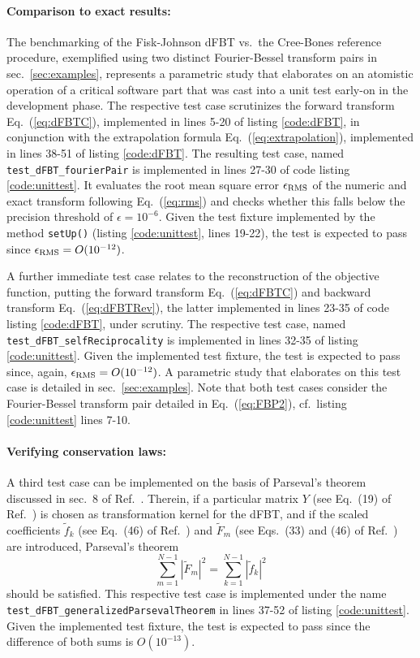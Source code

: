 \documentclass[12pt]{iopart}
\begin{document}
\paragraph{Comparison to exact results:}
The benchmarking of the Fisk-Johnson dFBT vs.\ the Cree-Bones reference
procedure, exemplified using two distinct Fourier-Bessel transform pairs in
sec.\ \ref{sec:examples}, represents a parametric study that elaborates on an
atomistic operation of a critical software part that was cast into a unit test
early-on in the development phase. 
The respective test case scrutinizes the forward transform Eq.\ (\ref{eq:dFBTC}),
implemented in lines 5-20 of listing \ref{code:dFBT}, in conjunction with the
extrapolation formula Eq.\ (\ref{eq:extrapolation}), implemented in lines 38-51
of listing \ref{code:dFBT}.  The resulting test case, named
{\tt{test\_dFBT\_fourierPair}} is implemented in lines 27-30 of code listing
\ref{code:unittest}. 
It evaluates the root mean square error $\epsilon_{\rm{RMS}}$ of the numeric
and exact transform following Eq.\ (\ref{eq:rms}) and checks whether this falls
below the precision threshold of $\epsilon=10^{-6}$. Given the test fixture
implemented by the method {\tt{setUp()}} (listing \ref{code:unittest}, lines
19-22), the test is expected to pass since $\epsilon_{\rm{RMS}}=O(10^{-12})$.

A further immediate test case relates to the reconstruction of the objective
function, putting the forward transform Eq.\ (\ref{eq:dFBTC}) and backward
transform Eq.\ (\ref{eq:dFBTRev}), the latter implemented in lines 23-35 of code
listing \ref{code:dFBT}, under scrutiny. The respective test case, named
{\tt{test\_dFBT\_selfReciprocality}} is implemented in lines 32-35 of listing
\ref{code:unittest}. Given the implemented test fixture, the test is expected
to pass since, again, $\epsilon_{\rm{RMS}}=O(10^{-12})$. A parametric study
that elaborates on this test case is detailed in sec.\ \ref{sec:examples}.
Note that both test cases consider the Fourier-Bessel transform pair detailed
in Eq.\ (\ref{eq:FBP2}), cf.\ listing \ref{code:unittest} lines 7-10.

\paragraph{Verifying conservation laws:}
A third test case can be implemented on the basis of Parseval's theorem
discussed in sec.\ 8 of Ref.\ \cite{Baddour:2015}. Therein, if a particular
matrix $Y$ (see Eq.\ (19) of Ref.\ \cite{Baddour:2015}) is chosen as
transformation kernel for the dFBT, and if the scaled coefficients
$\tilde{f}_{k}$ (see Eq.\ (46) of Ref.\
\cite{Baddour:2015}) and $\tilde{F}_{m}$ (see Eqs.\ (33) and (46) of
Ref.\ \cite{Baddour:2015}) are introduced, Parseval's theorem 
\begin{equation}
\sum_{m=1}^{N-1} | \tilde{F}_{m}|^2 = \sum_{k=1}^{N-1} | \tilde{f}_{k}|^2 
\end{equation}
should be satisfied.
This respective test case is implemented under the name
{\tt{test\_dFBT\_generalizedParsevalTheorem}} in lines 37-52 of listing
\ref{code:unittest}.  Given the implemented test fixture, the test is expected
to pass since the difference of both sums is $O(10^{-13})$.
\end{document}
